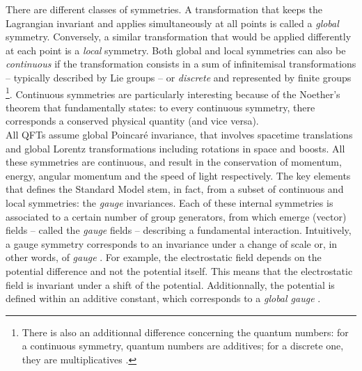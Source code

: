 There are different classes of symmetries. A transformation that keeps the Lagrangian invariant and applies simultaneously at all points is called a \textit{global} symmetry. Conversely, a similar transformation that would be applied differently at each point is a \textit{local} symmetry. Both global and local symmetries can also be \textit{continuous} if the transformation consists in a sum of infinitemisal transformations -- typically described by Lie groups -- or \textit{discrete} and represented by finite groups \cite{peskinIntroductionQuantumField2018}\footnote{There is also an additionnal difference concerning the quantum numbers: for a continuous symmetry, quantum numbers are additives; for a discrete one, they are multiplicatives \cite{braibantParticlesFundamentalInteractions2012}.}. Continuous symmetries are particularly interesting because of the Noether's theorem \cite{noetherInvariantVariationProblems1971} that fundamentally states: to every continuous symmetry, there corresponds a conserved physical quantity (and vice versa).\\

All QFTs assume global Poincaré invariance, that involves spacetime translations and global Lorentz transformations including rotations in space and boosts. All these symmetries are continuous, and result in the conservation of momentum, energy, angular momentum and the speed of light respectively. The key elements that defines the Standard Model stem, in fact, from a subset of continuous and local symmetries: the \textit{gauge} invariances. Each of these internal symmetries is associated to a certain number of group generators, from which emerge (vector) fields -- called the \textit{gauge} fields --
describing a fundamental interaction. Intuitively, a gauge symmetry corresponds to an invariance under a change of scale or, in other words, of \textit{gauge} \cite{DefinitionGAUGE2023}. For example, the electrostatic field depends on the potential difference and not the potential itself. This means that the electrostatic field is invariant under a shift of the potential. Additionnally, the potential is defined within an additive constant, which corresponds to a \textit{global gauge} \cite{braibantParticlesFundamentalInteractions2012}.

